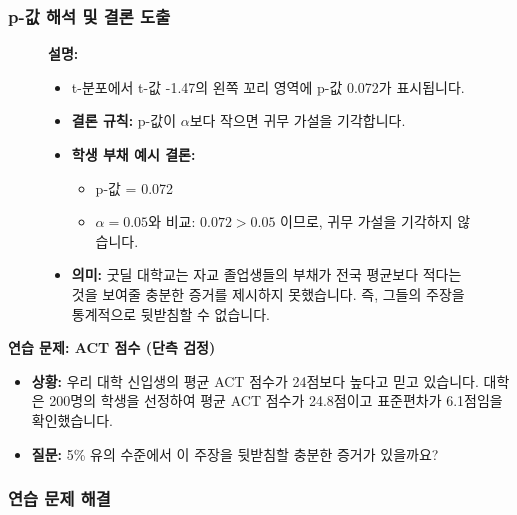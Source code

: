 \documentclass[11pt,a4paper]{article}
\theoremstyle{definition}
\begin{document}
\subsubsection*{p-값 해석 및 결론 도출}

\begin{figure}[h!]
    \centering
    \label{fig:one_tail_left_p_value}
    \vspace{0.5em}
    \textbf{설명:}
    \begin{itemize}
        \item t-분포에서 t-값 -1.47의 왼쪽 꼬리 영역에 p-값 0.072가 표시됩니다.
        \item \textbf{결론 규칙:} p-값이 $\alpha$보다 작으면 귀무 가설을 기각합니다.
        \item \textbf{학생 부채 예시 결론:}
            \begin{itemize}
                \item p-값 = 0.072
                \item $\alpha = 0.05$와 비교: $0.072 > 0.05$ 이므로, 귀무 가설을 기각하지 않습니다.
            \end{itemize}
        \item \textbf{의미:} 굿딜 대학교는 자교 졸업생들의 부채가 전국 평균보다 적다는 것을 보여줄 충분한 증거를 제시하지 못했습니다. 즉, 그들의 주장을 통계적으로 뒷받침할 수 없습니다.
    \end{itemize}
\end{figure}

\begin{examplebox}
\textbf{연습 문제: ACT 점수 (단측 검정)}
\begin{itemize}
    \item \textbf{상황:} 우리 대학 신입생의 평균 ACT 점수가 24점보다 높다고 믿고 있습니다. 대학은 200명의 학생을 선정하여 평균 ACT 점수가 24.8점이고 표준편차가 6.1점임을 확인했습니다.
    \item \textbf{질문:} 5\% 유의 수준에서 이 주장을 뒷받침할 충분한 증거가 있을까요?
\end{itemize}
\end{examplebox}

\subsubsection*{연습 문제 해결}
\end{document}
